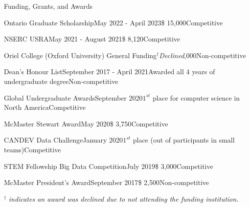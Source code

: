 \begin{rSection}{Funding, Grants, and Awards} 

\begin{aSubsection}{Ontario Graduate Scholarship}{May 2022 - April 2023}{\$ 15,000}{Competitive}
\end{aSubsection}

\begin{aSubsection}{NSERC USRA}{May 2021 - August 2021}{\$ 8,120}{Competitive}
\end{aSubsection}

\begin{aSubsection}{Oriel College (Oxford University) General Funding}{$^\dagger$\emph{Declined}}{,000}{Non-competitive}
\end{aSubsection}

\begin{aSubsection}{Dean's Honour List}{September 2017 - April 2021}{Awarded all 4 years of undergraduate degree}{Non-competitive}
\end{aSubsection}

\begin{aSubsection}{Global Undergraduate Awards}{September 2020}{$1^{st}$ place for computer science in North America}{Competitive}
\end{aSubsection}

\begin{aSubsection}{McMaster Stewart Award}{May 2020}{\$ 3,750}{Competitive}
\end{aSubsection}

\begin{aSubsection}{CANDEV Data Challenge}{January 2020}{$1^{st}$ place (out of  participants in small teams)}{Competitive}
\end{aSubsection}

\begin{aSubsection}{STEM Fellowship Big Data Competition}{July 2019}{\$ 3,000}{Competitive}
\end{aSubsection}

\begin{aSubsection}{McMaster President's Award}{September 2017}{\$ 2,500}{Non-competitive}
\end{aSubsection}

\smallskip
$^\dagger$ \emph{indicates an award was declined due to not attending the funding institution.}

\end{rSection}

